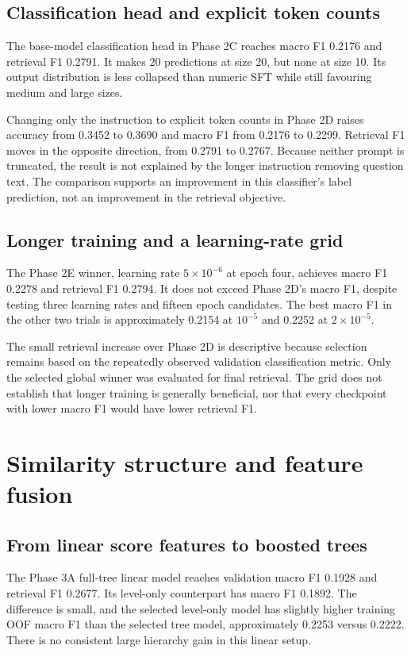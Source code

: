 \subsection{Classification head and explicit token counts}
The base-model classification head in Phase 2C reaches macro F1
0.2176 and retrieval F1 0.2791. It makes 20 predictions at size
20, but none at size 10. Its output distribution is less collapsed
than numeric SFT while still favouring medium and large sizes.

Changing only the instruction to explicit token counts in Phase 2D
raises accuracy from 0.3452 to 0.3690 and macro F1 from 0.2176
to 0.2299. Retrieval F1 moves in the opposite direction, from
0.2791 to 0.2767. Because neither prompt is truncated, the result
is not explained by the longer instruction removing question text.
The comparison supports an improvement in this classifier's label
prediction, not an improvement in the retrieval objective.

\subsection{Longer training and a learning-rate grid}
The Phase 2E winner, learning rate $5\times10^{-6}$ at epoch four,
achieves macro F1 0.2278 and retrieval F1 0.2794. It does not
exceed Phase 2D's macro F1, despite testing three learning rates
and fifteen epoch candidates. The best macro F1 in the other two
trials is approximately 0.2154 at $10^{-5}$ and 0.2252 at
$2\times10^{-5}$.

The small retrieval increase over Phase 2D is descriptive because
selection remains based on the repeatedly observed validation
classification metric. Only the selected global winner was evaluated
for final retrieval. The grid does not establish that longer
training is generally beneficial, nor that every checkpoint with
lower macro F1 would have lower retrieval F1.

\section{Similarity structure and feature fusion}


\subsection{From linear score features to boosted trees}
The Phase 3A full-tree linear model reaches validation macro F1
0.1928 and retrieval F1 0.2677. Its level-only counterpart has
macro F1 0.1892. The difference is small, and the selected
level-only model has slightly higher training OOF macro F1 than
the selected tree model, approximately 0.2253 versus 0.2222.
There is no consistent large hierarchy gain in this linear setup.


